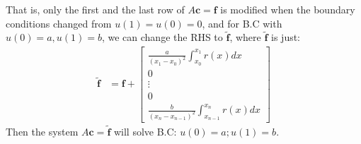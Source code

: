 \documentclass[]{article}
\begin{document}
        That is, only the first and the last row of $A\mathbf{c} = \mathbf{f}$ is modified when the boundary conditions changed from $u(1) = u(0) = 0$, and for B.C with $u(0) = a, u(1) = b$, we can change the RHS to $\tilde{\mathbf{f}}$, where $\tilde{\mathbf{f}}$ is just: 
        \begin{align*}\tag{1.e.6}\label{eqn:1.e.6}
            \tilde{\mathbf{f}} &= 
            \mathbf{f} + 
            \begin{bmatrix}
                \frac{a}{(x_1 - x_0)^2}\int_{x_0}^{x_1} 
                    r(x)
                dx
                \\
                0
                \\
                \vdots 
                \\
                0 
                \\
                \frac{b}{(x_n - x_{n - 1})^2}\int_{x_{n - 1}}^{x_n} 
                r(x)
                dx
            \end{bmatrix}
        \end{align*}
        Then the system $A\mathbf{c} = \tilde{\mathbf{f}}$ will solve B.C: $u(0) = a; u(1) = b$. 
\end{document}
